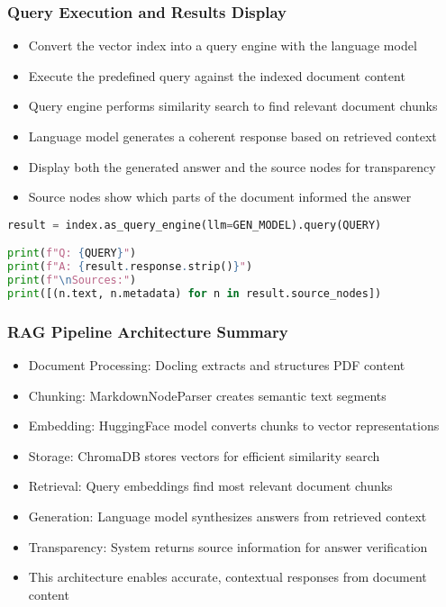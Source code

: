 \begin{frame}[fragile]\frametitle{Query Execution and Results Display}
      \begin{itemize}
          \item Convert the vector index into a query engine with the language model
          \item Execute the predefined query against the indexed document content
          \item Query engine performs similarity search to find relevant document chunks
          \item Language model generates a coherent response based on retrieved context
          \item Display both the generated answer and the source nodes for transparency
          \item Source nodes show which parts of the document informed the answer
      \end{itemize}
      
\begin{lstlisting}[language=Python]
result = index.as_query_engine(llm=GEN_MODEL).query(QUERY)

print(f"Q: {QUERY}")
print(f"A: {result.response.strip()}")
print(f"\nSources:")
print([(n.text, n.metadata) for n in result.source_nodes])
\end{lstlisting}
\end{frame}

\begin{frame}[fragile]\frametitle{RAG Pipeline Architecture Summary}
      \begin{itemize}
          \item Document Processing: Docling extracts and structures PDF content
          \item Chunking: MarkdownNodeParser creates semantic text segments
          \item Embedding: HuggingFace model converts chunks to vector representations
          \item Storage: ChromaDB stores vectors for efficient similarity search
          \item Retrieval: Query embeddings find most relevant document chunks
          \item Generation: Language model synthesizes answers from retrieved context
          \item Transparency: System returns source information for answer verification
          \item This architecture enables accurate, contextual responses from document content
      \end{itemize}
\end{frame}